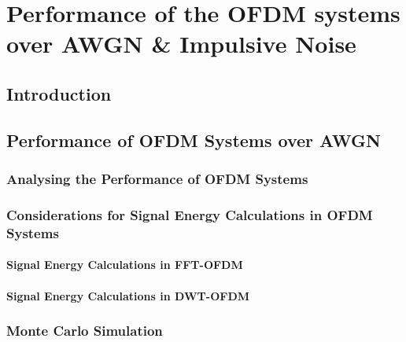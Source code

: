 \chapter{Performance of the OFDM systems over AWGN \& Impulsive Noise} \label{chap4}
	\section{Introduction}
	\section{Performance of OFDM Systems over AWGN} \label{sec4:analysing}
	\subsection{Analysing the Performance of OFDM Systems}
		\subsection{Considerations for Signal Energy Calculations in OFDM Systems} \label{subsec4:consid}
			\subsubsection{Signal Energy Calculations in FFT-OFDM}  
			\subsubsection{Signal Energy Calculations in DWT-OFDM}
		\subsection{Monte Carlo Simulation}
